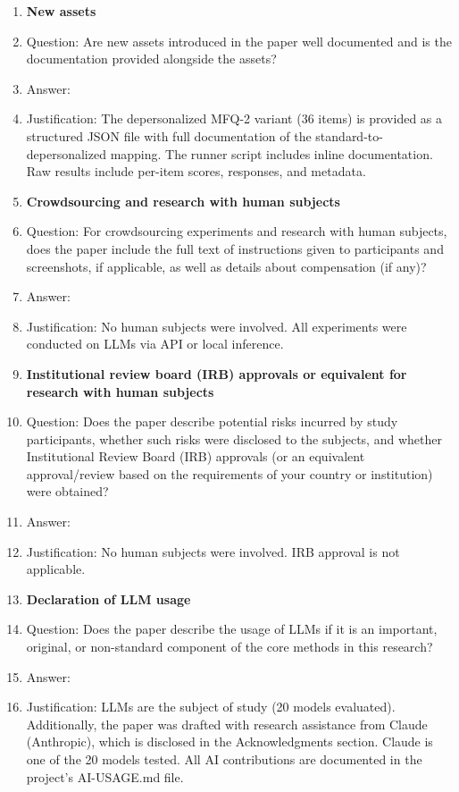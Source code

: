 \begin{enumerate}
\item {\bf New assets}
    \item[] Question: Are new assets introduced in the paper well documented and is the documentation provided alongside the assets?
    \item[] Answer: \answerYes{}
    \item[] Justification: The depersonalized MFQ-2 variant (36 items) is provided as a structured JSON file with full documentation of the standard-to-depersonalized mapping. The runner script includes inline documentation. Raw results include per-item scores, responses, and metadata.

\item {\bf Crowdsourcing and research with human subjects}
    \item[] Question: For crowdsourcing experiments and research with human subjects, does the paper include the full text of instructions given to participants and screenshots, if applicable, as well as details about compensation (if any)?
    \item[] Answer: \answerNA{}
    \item[] Justification: No human subjects were involved. All experiments were conducted on LLMs via API or local inference.

\item {\bf Institutional review board (IRB) approvals or equivalent for research with human subjects}
    \item[] Question: Does the paper describe potential risks incurred by study participants, whether such risks were disclosed to the subjects, and whether Institutional Review Board (IRB) approvals (or an equivalent approval/review based on the requirements of your country or institution) were obtained?
    \item[] Answer: \answerNA{}
    \item[] Justification: No human subjects were involved. IRB approval is not applicable.

\item {\bf Declaration of LLM usage}
    \item[] Question: Does the paper describe the usage of LLMs if it is an important, original, or non-standard component of the core methods in this research?
    \item[] Answer: \answerYes{}
    \item[] Justification: LLMs are the subject of study (20 models evaluated). Additionally, the paper was drafted with research assistance from Claude (Anthropic), which is disclosed in the Acknowledgments section. Claude is one of the 20 models tested. All AI contributions are documented in the project's AI-USAGE.md file.

\end{enumerate}
